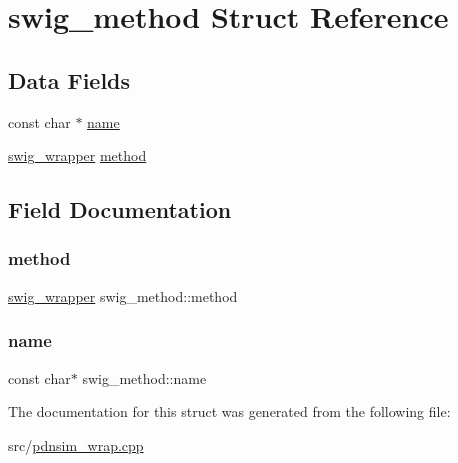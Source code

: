 \hypertarget{structswig__method}{}\section{swig\+\_\+method Struct Reference}
\label{structswig__method}
\subsection*{Data Fields}
\begin{DoxyCompactItemize}
\item 
const char $\ast$ \hyperlink{structswig__method_ac49e680ac1d2b0255de147c5f3ec44d2}{name}
\item 
\hyperlink{pdnsim__wrap_8cpp_a26e4d1918011eb5b4aa36f67e1d5a318}{swig\+\_\+wrapper} \hyperlink{structswig__method_ad2006ee1cedbefd358f704920d9ecad0}{method}
\end{DoxyCompactItemize}


\subsection{Field Documentation}
\mbox{\label{structswig__method_ad2006ee1cedbefd358f704920d9ecad0}} 
\subsubsection{\texorpdfstring{method}{method}}
{\footnotesize\ttfamily \hyperlink{pdnsim__wrap_8cpp_a26e4d1918011eb5b4aa36f67e1d5a318}{swig\+\_\+wrapper} swig\+\_\+method\+::method}

\mbox{\label{structswig__method_ac49e680ac1d2b0255de147c5f3ec44d2}} 
\subsubsection{\texorpdfstring{name}{name}}
{\footnotesize\ttfamily const char$\ast$ swig\+\_\+method\+::name}



The documentation for this struct was generated from the following file\+:\begin{DoxyCompactItemize}
\item 
src/\hyperlink{pdnsim__wrap_8cpp}{pdnsim\+\_\+wrap.\+cpp}\end{DoxyCompactItemize}
